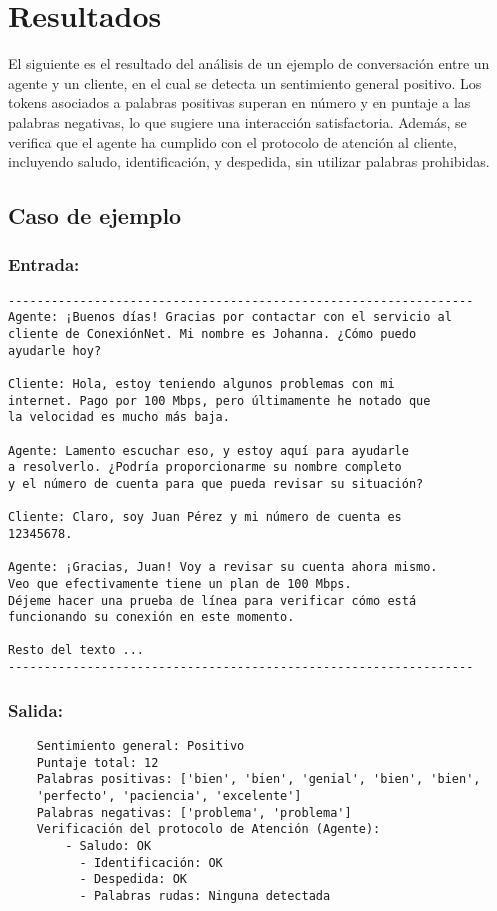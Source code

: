 \section{Resultados}
El siguiente es el resultado del análisis de un ejemplo de conversación entre un agente y un
cliente, en el cual se detecta un sentimiento general positivo. Los tokens asociados a palabras
positivas superan en número y en puntaje a las palabras negativas, lo que sugiere una
interacción satisfactoria. Además, se verifica que el agente ha cumplido con el protocolo de
atención al cliente, incluyendo saludo, identificación, y despedida, sin utilizar palabras
prohibidas.

\subsection{Caso de ejemplo}
\subsubsection*{Entrada:}
\begin{verbatim}
-----------------------------------------------------------------    
Agente: ¡Buenos días! Gracias por contactar con el servicio al 
cliente de ConexiónNet. Mi nombre es Johanna. ¿Cómo puedo 
ayudarle hoy?

Cliente: Hola, estoy teniendo algunos problemas con mi 
internet. Pago por 100 Mbps, pero últimamente he notado que 
la velocidad es mucho más baja.

Agente: Lamento escuchar eso, y estoy aquí para ayudarle 
a resolverlo. ¿Podría proporcionarme su nombre completo 
y el número de cuenta para que pueda revisar su situación?

Cliente: Claro, soy Juan Pérez y mi número de cuenta es 
12345678.

Agente: ¡Gracias, Juan! Voy a revisar su cuenta ahora mismo.
Veo que efectivamente tiene un plan de 100 Mbps. 
Déjeme hacer una prueba de línea para verificar cómo está 
funcionando su conexión en este momento.

Resto del texto ... 
-----------------------------------------------------------------    
\end{verbatim}

\subsubsection*{Salida:}
\begin{tcolorbox}[colback=gray!10, colframe=gray!80, sharp corners, boxrule=0.5pt]
	\begin{verbatim}
    Sentimiento general: Positivo
    Puntaje total: 12
    Palabras positivas: ['bien', 'bien', 'genial', 'bien', 'bien', 
    'perfecto', 'paciencia', 'excelente']
    Palabras negativas: ['problema', 'problema']
    Verificación del protocolo de Atención (Agente):
        - Saludo: OK
          - Identificación: OK
          - Despedida: OK
          - Palabras rudas: Ninguna detectada
          \end{verbatim}
\end{tcolorbox}

